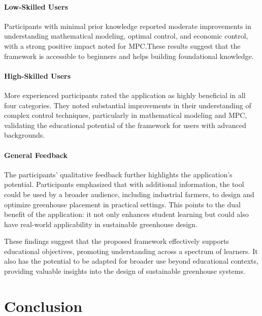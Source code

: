 \documentclass[conference]{IEEEtran}
\begin{document}
\paragraph{Low-Skilled Users}
Participants with minimal prior knowledge reported moderate improvements in understanding mathematical modeling, optimal control, and economic control, with a strong positive impact noted for MPC.\@ These results suggest that the framework is accessible to beginners and helps building foundational knowledge.

\paragraph{High-Skilled Users}
More experienced participants rated the application as highly beneficial in all four categories. They noted substantial improvements in their understanding of complex control techniques, particularly in mathematical modeling and MPC, validating the educational potential of the framework for users with advanced backgrounds.

\paragraph{General Feedback}
The participants' qualitative feedback further highlights the application's potential. Participants emphasized that with additional information, the tool could be used by a broader audience, including industrial farmers, to design and optimize greenhouse placement in practical settings. This points to the dual benefit of the application: it not only enhances student learning but could also have real-world applicability in sustainable greenhouse design.

These findings suggest that the proposed framework effectively supports educational objectives, promoting understanding across a spectrum of learners. It also has the potential to be adapted for broader use beyond educational contexts, providing valuable insights into the design of sustainable greenhouse systems.

\section{Conclusion}



\end{document}
